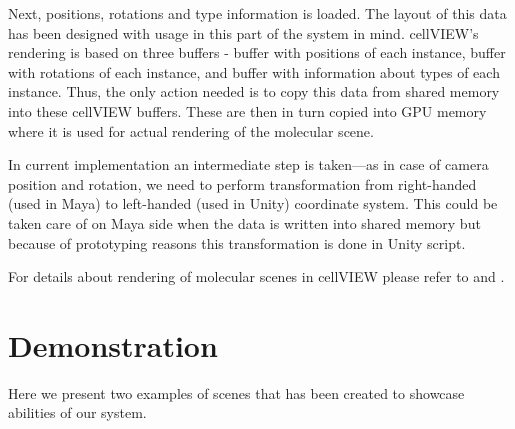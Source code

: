 \documentclass[
  digital, %
  table,   %
  nolof,     %
  nolot,     %
  oneside,
]{fithesis3}
\begin{document}
Next, positions, rotations and type information is loaded. The layout of this data has been designed with usage in this part of the system in mind. cellVIEW's rendering is based on three buffers - buffer with positions of each instance, buffer with rotations of each instance, and buffer with information about types of each instance. Thus, the only action needed is to copy this data from shared memory into these cellVIEW buffers. These are then in turn copied into GPU memory where it is used for actual rendering of the molecular scene.

In current implementation an intermediate step is taken—as in case of camera position and rotation, we need to perform transformation from right-handed (used in Maya) to left-handed (used in Unity) coordinate system. This could be taken care of on Maya side when the data is written into shared memory but because of prototyping reasons this transformation is done in Unity script.

For details about rendering of molecular scenes in cellVIEW please refer to \cite{lemuzic-2014-ivm} and \cite{cellVIEW_2015}.

\chapter{Demonstration}
\label{chap:demonstration}
Here we present two examples of scenes that has been created to showcase abilities of our system.
\end{document}
